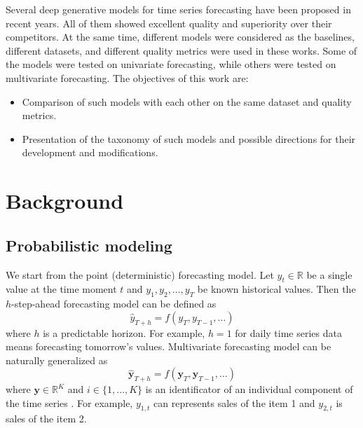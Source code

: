\documentclass[12pt,a4paper]{article}
\begin{document}
Several deep generative models for time series forecasting have been proposed in recent years. All of them showed excellent quality and superiority over their competitors. At the same time, different models were considered as the baselines, different datasets, and different quality metrics were used in these works. Some of the models were tested on univariate forecasting, while others were tested on multivariate forecasting. The objectives of this work are:
\begin{itemize}
    \item Comparison of such models with each other on the same dataset and quality metrics.
    \item Presentation of the taxonomy of such models and possible directions for their development and modifications.
\end{itemize}

\section{Background}

\subsection{Probabilistic modeling}

We start from the point (deterministic) forecasting model. Let $y_t \in \mathbb R$ be a single value at the time moment $t$ and $y_1, y_2, \dots, y_T$ be known historical values. Then the $h$-step-ahead forecasting model can be defined as 
$$\hat{y}_{T+h} = f(y_T, y_{T-1}, \dots)$$
where $h$ is a predictable horizon. For example, $h=1$ for daily time series data means forecasting tomorrow's values. Multivariate forecasting model can be naturally generalized as
$$\hat{\mathbf y}_{T+h} = f(\mathbf y_T, \mathbf y_{T-1}, \dots)$$
where $\mathbf y \in \mathbb R^K$ and $i \in \{1, \dots, K\}$ is an identificator of an individual component of the time series \cite{mts2007}. For example, $y_{1,t}$ can represents sales of the item 1 and $y_{2,t}$ is sales of the item 2. 
\end{document}

